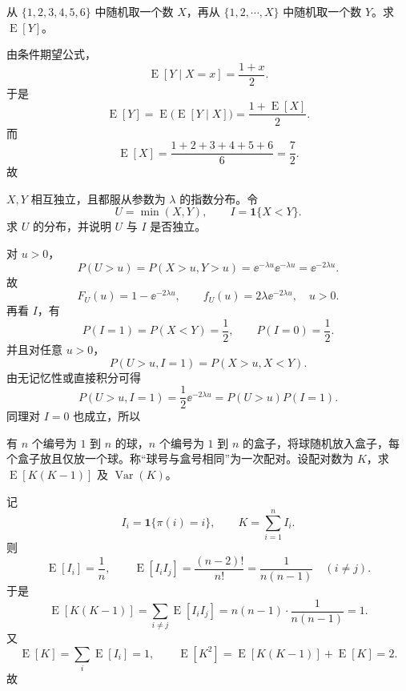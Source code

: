 ﻿

\begin{question}
从 $\{1,2,3,4,5,6\}$ 中随机取一个数 $X$，再从 $\{1,2,\cdots,X\}$ 中随机取一个数 $Y$。求 $\operatorname{E}[Y]$。
\begin{solution}
由条件期望公式，
\[
\operatorname{E}[Y\mid X=x]=\frac{1+x}{2}.
\]
于是
\[
\operatorname{E}[Y]=\operatorname{E}\bigl(\operatorname{E}[Y\mid X]\bigr)=\frac{1+\operatorname{E}[X]}{2}.
\]
而
\[
\operatorname{E}[X]=\frac{1+2+3+4+5+6}{6}=\frac72.
\]
故
\end{solution}
\end{question}

\begin{question}
$X,Y$ 相互独立，且都服从参数为 $\lambda$ 的指数分布。令
\[
U=\min(X,Y),\qquad I=\mathbf 1\{X<Y\}.
\]
求 $U$ 的分布，并说明 $U$ 与 $I$ 是否独立。
\begin{solution}
对 $u>0$，
\[
P(U>u)=P(X>u,Y>u)=\ee^{-\lambda u}\ee^{-\lambda u}=\ee^{-2\lambda u}.
\]
故
\[
F_U(u)=1-\ee^{-2\lambda u},\qquad
f_U(u)=2\lambda \ee^{-2\lambda u},\quad u>0.
\]
再看 $I$，有
\[
P(I=1)=P(X<Y)=\frac12,\qquad P(I=0)=\frac12.
\]
并且对任意 $u>0$，
\[
P(U>u,I=1)=P(X>u,X<Y).
\]
由无记忆性或直接积分可得
\[
P(U>u,I=1)=\frac12 \ee^{-2\lambda u}=P(U>u)P(I=1).
\]
同理对 $I=0$ 也成立，所以
\end{solution}
\end{question}

\begin{question}
有 $n$ 个编号为 $1$ 到 $n$ 的球，$n$ 个编号为 $1$ 到 $n$ 的盒子，将球随机放入盒子，每个盒子放且仅放一个球。称“球号与盒号相同”为一次配对。设配对数为 $K$，求 $\operatorname{E}[K(K-1)]$ 及 $\operatorname{Var}(K)$。
\begin{solution}
记
\[
I_i=\mathbf 1\{\pi(i)=i\},
\qquad K=\sum_{i=1}^n I_i.
\]
则
\[
\operatorname{E}[I_i]=\frac1n,\qquad \operatorname{E}[I_iI_j]=\frac{(n-2)!}{n!}=\frac{1}{n(n-1)}\quad(i\ne j).
\]
于是
\[
\operatorname{E}[K(K-1)]=\sum_{i\ne j}\operatorname{E}[I_iI_j]
=n(n-1)\cdot \frac{1}{n(n-1)}=1.
\]
又
\[
\operatorname{E}[K]=\sum_i \operatorname{E}[I_i]=1,
\qquad
\operatorname{E}[K^2]=\operatorname{E}[K(K-1)]+\operatorname{E}[K]=2.
\]
故
\end{solution}
\end{question}

